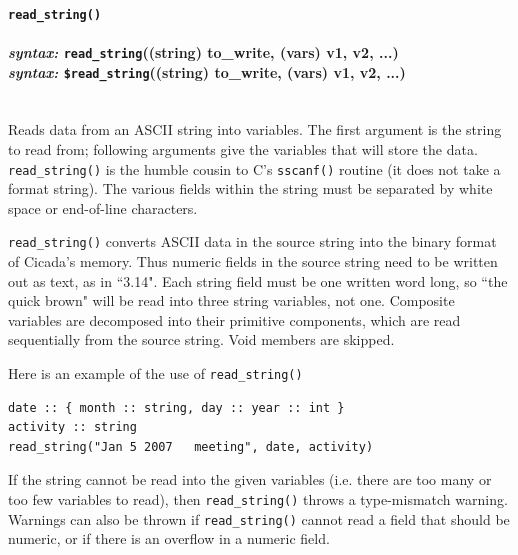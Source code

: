 \documentclass{article}
\newenvironment{code}{
       \begin{list}{}{
               \setlength{\leftmargin}{.4in}
               \setlength{\rightmargin}{0in}
               \setlength{\topsep}{.2in}
       }
       \small
       \item[] }
       { \end{list}   }
\begin{document}





\paragraph{\texttt{read\_string()}\\\\
\normalfont \emph{syntax: } \texttt{read\_string}((string) to\_write, (vars) v1, v2, ...)\\
\normalfont \emph{syntax: } \texttt{\$read\_string}((string) to\_write, (vars) v1, v2, ...)\\\\}
 

Reads data from an ASCII string into variables.  The first argument is the string to read from; following arguments give the variables that will store the data.  \texttt{read\_string()} is the humble cousin to C's \texttt{sscanf()} routine (it does not take a format string).  The various fields within the string must be separated by white space or end-of-line characters.

\texttt{read\_string()} converts ASCII data in the source string into the binary format of Cicada's memory.  Thus numeric fields in the source string need to be written out as text, as in ``3.14".  Each string field must be one written word long, so ``the quick brown" will be read into three string variables, not one.  Composite variables are decomposed into their primitive components, which are read sequentially from the source string.  Void members are skipped.

Here is an example of the use of \texttt{read\_string()}

\begin{code} \begin{verbatim}
date :: { month :: string, day :: year :: int }
activity :: string
read_string("Jan 5 2007   meeting", date, activity)
\end{verbatim} \end{code}

If the string cannot be read into the given variables (i.e. there are too many or too few variables to read), then \verb#read_string()# throws a type-mismatch warning.  Warnings can also be thrown if \verb#read_string()# cannot read a field that should be numeric, or if there is an overflow in a numeric field.
\end{document}
